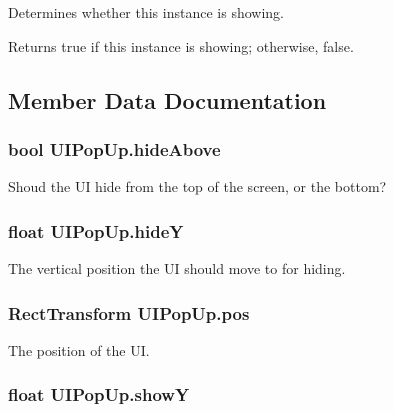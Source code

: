 Determines whether this instance is showing. 

\begin{DoxyReturn}{Returns}
{\ttfamily true} if this instance is showing; otherwise, {\ttfamily false}.
\end{DoxyReturn}


\subsection{Member Data Documentation}
\subsubsection[{hide\+Above}]{\setlength{\rightskip}{0pt plus 5cm}bool U\+I\+Pop\+Up.\+hide\+Above}\label{class_u_i_pop_up_a08dd327672fa2988751468c64624b49c}


Shoud the UI hide from the top of the screen, or the bottom? 

\subsubsection[{hideY}]{\setlength{\rightskip}{0pt plus 5cm}float U\+I\+Pop\+Up.\+hideY}\label{class_u_i_pop_up_af348533bd87896b58b9b71a63cbbddba}


The vertical position the UI should move to for hiding. 

\subsubsection[{pos}]{\setlength{\rightskip}{0pt plus 5cm}Rect\+Transform U\+I\+Pop\+Up.\+pos}\label{class_u_i_pop_up_afd353b97181fa8fbad1222f0af69d1d2}


The position of the UI. 

\subsubsection[{showY}]{\setlength{\rightskip}{0pt plus 5cm}float U\+I\+Pop\+Up.\+showY}\label{class_u_i_pop_up_a4bd553bffe09e1bcf5c08f1bc30d7ea0}


